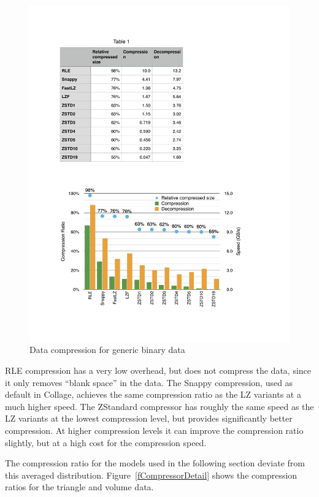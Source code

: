 \documentclass[10pt,journal,compsoc]{IEEEtran}
\newcommand{\fig}[1]{Figure~\ref{#1}}
\begin{document}
\begin{figure}[ht]\center
  \includegraphics[width=\columnwidth]{images/compressor}
  \caption{\label{fCompressor}Data compression for generic binary data}
\end{figure}

RLE compression has a very low overhead, but does not compress the data, since
it only removes ``blank space'' in the data. The Snappy compression, used as
default in \textsf{Collage}, achieves the same compression ratio as the LZ
variants at a much higher speed. The ZStandard compressor has roughly the same
speed as the LZ variants at the lowest compression level, but provides
significantly better compression. At higher compression levels it can improve
the compression ratio slightly, but at a high cost for the compression speed.

The compression ratio for the models used in the following section deviate from
this averaged distribution. \fig{fCompressorDetail} shows the compression ratios
for the triangle and volume data.
\end{document}
